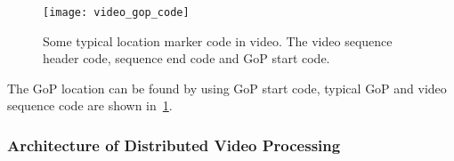 \begin{figure}[!htbp]
  \centering
  \begin{minipage}{1.0\columnwidth}
  \texttt{[image: video\_gop\_code]}
  \end{minipage}
  
  \vspace{-1ex}
  \caption
    {
    \small
    Some typical location marker code in video. The video sequence header code,
    sequence end code and GoP start code. 
    }
  \label{fig:video_gop_code}
\end{figure}

The GoP location can be found by using GoP start code, typical GoP and video
sequence code are shown in~\fig\ref{fig:video_gop_code}. 


\subsubsection{Architecture of Distributed Video Processing}




